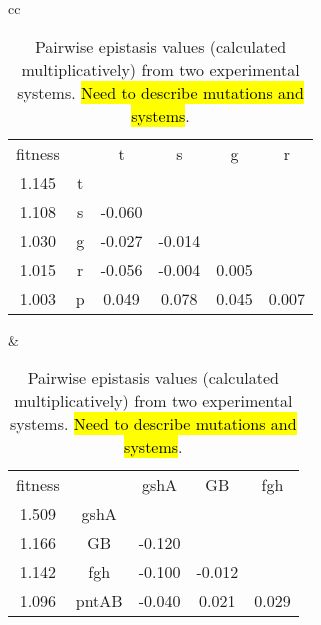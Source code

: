 \begin{table}
\newcommand{\hlB}{\cellcolor{blue!20}}
\newcommand{\hlR}{\cellcolor{red!20}}
\centering
\begin{tabular}{cc}
\begin{subtable}[b]{0.5\textwidth}
\caption{\citet{Khan2011}}
\begin{tabular}{cccccc}
fitness &   & t           & s           & g           & r           \\
1.145   & t &             &             &             &             \\
1.108   & s & \hlB -0.060 &             &             &             \\
1.030   & g & \hlB -0.027 & \hlB -0.014 &             &             \\
1.015   & r & \hlB -0.056 & \hlB -0.004 & \hlR 0.005  &             \\
1.003   & p & \hlR  0.049 & \hlR  0.078 & \hlR 0.045  & \hlR 0.007  \\
\end{tabular}
\end{subtable}
&
\begin{subtable}[b]{0.5\textwidth}
\caption{\citet{Chou2011}}
\begin{tabular}{ccccc}
fitness &       & gshA        & GB          & fgh         \\
1.509   & gshA  &             &             &             \\
1.166   & GB    & \hlB -0.120 &             &             \\
1.142   & fgh   & \hlB -0.100 & \hlB -0.012 &             \\
1.096   & pntAB & \hlB -0.040 & \hlR  0.021 & \hlR 0.029  \\
\end{tabular}
\end{subtable}
\\
\end{tabular}
\caption{Pairwise epistasis values (calculated multiplicatively) from 
two experimental systems. \hl{Need to describe mutations and systems}.}
\label{tab:pairwiseBeneEpi}
\end{table}


